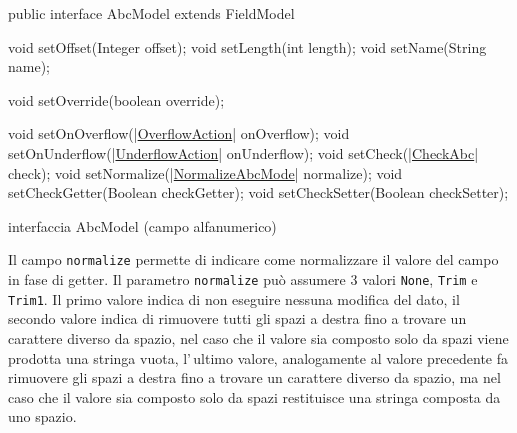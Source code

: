 \documentclass[a4paper,10pt]{report}
\newif\ifesource
\newenvironment{elisting}[1][H]
  {\captionsetup{aboveskip=0pt}\begin{listing}[#1]}
  {\end{listing}%
}
\begin{document}
\ifesource
\begin{figure*}[!htb]
\begin{lstlisting}[language=java, 
caption=interfaccia AbcModel (campo alfanumerico), 
label=lst:AbcModel]
public interface AbcModel extends FieldModel {
    void setOffset(Integer offset);
    void setLength(int length);
    void setName(String name);

    void setOverride(boolean override);

    void setOnOverflow((*\hyperref[lst:OverflowAction]{OverflowAction}*) onOverflow);
    void setOnUnderflow((*\hyperref[lst:UnderflowAction]{UnderflowAction}*) onUnderflow);
    void setCheck((*\hyperref[lst:CheckAbc]{CheckAbc}*) check);
    void setNormalize((*\hyperref[lst:NormalizeAbcMode]{NormalizeAbcMode}*) normalize);
    void setCheckGetter(Boolean checkGetter);
    void setCheckSetter(Boolean checkSetter);
}
\end{lstlisting}\index{AbcModel}
\end{figure*}
\else
\begin{elisting}[!htb]
\begin{javacode}
public interface AbcModel extends FieldModel {
    void setOffset(Integer offset);
    void setLength(int length);
    void setName(String name);

    void setOverride(boolean override);

    void setOnOverflow(|\hyperref[lst:OverflowAction]{OverflowAction}| onOverflow);
    void setOnUnderflow(|\hyperref[lst:UnderflowAction]{UnderflowAction}| onUnderflow);
    void setCheck(|\hyperref[lst:CheckAbc]{CheckAbc}| check);
    void setNormalize(|\hyperref[lst:NormalizeAbcMode]{NormalizeAbcMode}| normalize);
    void setCheckGetter(Boolean checkGetter);
    void setCheckSetter(Boolean checkSetter);
}
\end{javacode}
\caption{interfaccia AbcModel (campo alfanumerico)}
\label{lst:AbcModel}
\end{elisting}
\fi

Il campo \hypertarget{abc:nrm}{\texttt{normalize}} permette di indicare come 
normalizzare il valore del campo in fase di getter.
Il parametro \verb!normalize! può assumere 3 valori \verb!None!, \verb!Trim! e
\verb!Trim1!. Il primo valore indica di non eseguire nessuna modifica del dato,
il secondo valore indica di rimuovere tutti gli spazi a destra fino a trovare
un carattere diverso da spazio, nel caso che il valore sia composto solo da
spazi viene prodotta una stringa vuota, l'\,ultimo valore, analogamente al 
valore precedente fa rimuovere gli spazi a destra fino a trovare un carattere
diverso da spazio, ma nel caso che il valore sia composto solo da spazi 
restituisce una stringa composta da uno spazio.
\end{document}
